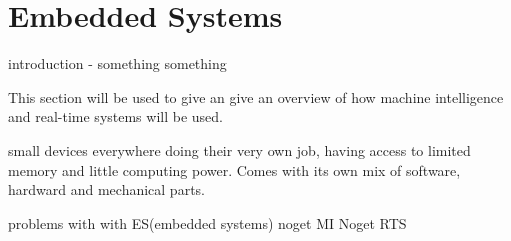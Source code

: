 \section{Embedded Systems}

introduction - something something

This section will be used to give an give an overview of how machine
intelligence and real-time systems will be used.

small devices everywhere doing their very own job, having access to limited
memory and little computing power.
Comes with its own mix of software, hardward and mechanical parts.


problems with with ES(embedded systems)
noget MI
Noget RTS
